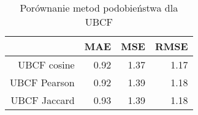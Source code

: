 \begin{table}[ht]
\centering
\begin{tabular}{rrrr}
  \hline
 & MAE & MSE & RMSE \\ 
  \hline
UBCF cosine & 0.92 & 1.37 & 1.17 \\ 
  UBCF Pearson & 0.92 & 1.39 & 1.18 \\ 
  UBCF Jaccard & 0.93 & 1.39 & 1.18 \\ 
   \hline
\end{tabular}
\caption{Porównanie metod podobieństwa dla UBCF} 
\end{table}

